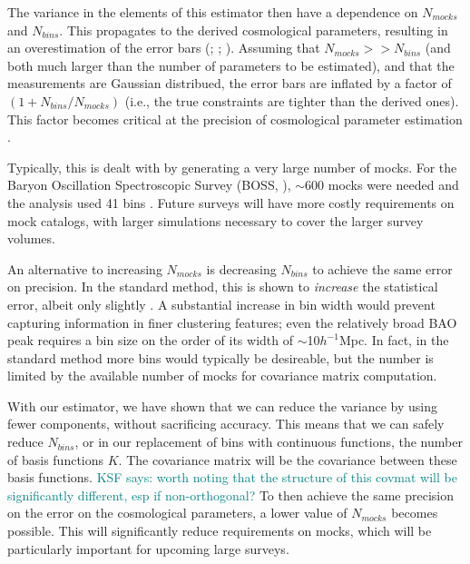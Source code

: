 \documentclass[modern]{aastex62}
\newcommand{\hmpc}{$h^{-1}$Mpc}
\newcommand{\KSF}[1]{\textcolor{teal}{KSF says: #1}}
\begin{document}
The variance in the elements of this estimator then have a dependence on $N_{mocks}$ and $N_{bins}$.
This propagates to the derived cosmological parameters, resulting in an overestimation of the error bars (\citealt{Hartlap2007}; \citealt{Dodelson2013} \citealt{Percival2014}; \citealt{TaylorJoachimi2014}).
Assuming that $N_{mocks} >> N_{bins}$ (and both much larger than the number of parameters to be estimated), and that the measurements are Gaussian distribued, the error bars are inflated by a factor of $(1 + N_{bins}/N_{mocks})$ (i.e., the true constraints are tighter than the derived ones).
This factor becomes critical at the precision of cosmological parameter estimation \citep{Percival2014}.

Typically, this is dealt with by generating a very large number of mocks.
For the Baryon Oscillation Spectroscopic Survey (BOSS, \citealt{Dawson2013}), $\sim$600 mocks were needed and the analysis used 41 bins \citep{Sanchez2012}.
Future surveys will have more costly requirements on mock catalogs, with larger simulations necessary to cover the larger survey volumes.

An alternative to increasing $N_{mocks}$ is decreasing $N_{bins}$ to achieve the same error on precision.
In the standard method, this is shown to \emph{increase} the statistical error, albeit only slightly \cite{Percival2014}.
A substantial increase in bin width would prevent capturing information in finer clustering features; even the relatively broad BAO peak requires a bin size on the order of its width of $\sim$10\hmpc.
In fact, in the standard method more bins would typically be desireable, but the number is limited by the available number of mocks for covariance matrix computation.

With our estimator, we have shown that we can reduce the variance by using fewer components, without sacrificing accuracy.
This means that we can safely reduce $N_{bins}$, or in our replacement of bins with continuous functions, the number of basis functions $K$.
The covariance matrix will be the covariance between these basis functions. \KSF{worth noting that the structure of this covmat will be significantly different, esp if non-orthogonal?}
To then achieve the same precision on the error on the cosmological parameters, a lower value of $N_{mocks}$ becomes possible.
This will significantly reduce requirements on mocks, which will be particularly important for upcoming large surveys. 
\end{document}
